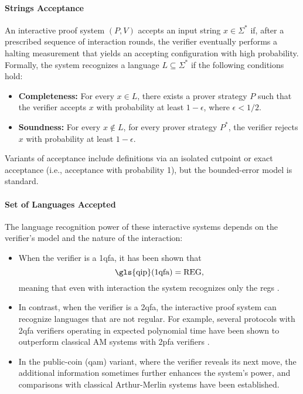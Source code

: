 \paragraph{Strings Acceptance}
An interactive proof system $(P,V)$ accepts an input string $x\in\Sigma^*$ if, after a prescribed sequence of interaction rounds, the verifier eventually performs a halting measurement that yields an accepting configuration with high probability. Formally, the system recognizes a language $L\subseteq\Sigma^*$ if the following conditions hold:
\begin{itemize}
  \item \textbf{Completeness:} For every $x\in L$, there exists a prover strategy $P$ such that the verifier accepts $x$ with probability at least $1-\epsilon$, where $\epsilon<1/2$.
  \item \textbf{Soundness:} For every $x\notin L$, for every prover strategy $P^*$, the verifier rejects $x$ with probability at least $1-\epsilon$.
\end{itemize}
Variants of acceptance include definitions via an isolated cutpoint or exact acceptance (i.e., acceptance with probability 1), but the bounded-error model is standard.

\paragraph{Set of Languages Accepted}
The language recognition power of these interactive systems depends on the verifier's model and the nature of the interaction:
\begin{itemize}
  \item When the verifier is a \gls{1qfa}, it has been shown that
  \[
  \text{\gls{qip}(1qfa)} = \text{REG},
  \]
  meaning that even with interaction the system recognizes only the \glspl{reg} \cite{nishimura2009application}.
  \item In contrast, when the verifier is a \gls{2qfa}, the interactive proof system can recognize languages that are not regular. For example, several protocols with 2qfa verifiers operating in expected polynomial time have been shown to outperform classical AM systems with 2pfa verifiers \cite{zheng2015power, nishimura2015interactive}.
  \item In the public-coin (\gls{qam}) variant, where the verifier reveals its next move, the additional information sometimes further enhances the system's power, and comparisons with classical Arthur-Merlin systems have been established.
\end{itemize}

